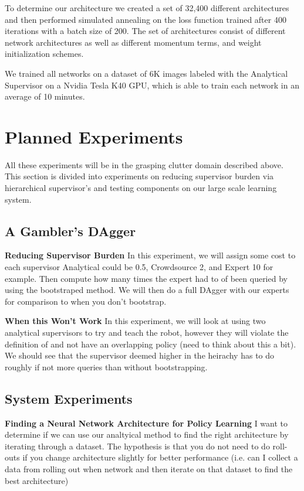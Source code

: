 \documentclass[10pt, conference]{ieeeconf}      %
\begin{document}
To determine our architecture we created a set of 32,400 different architectures and then performed simulated annealing on the loss function trained after 400 iterations with a batch size of 200. The set of architectures consist of different network architectures as well as different momentum terms, and weight initialization schemes. 

We trained all networks on a dataset of 6K images labeled with the Analytical Supervisor on a Nvidia Tesla K40 GPU, which is able to train each network in an average of 10 minutes.  


\section{Planned Experiments}
All these experiments will be in the grasping clutter domain described above. This section is divided into experiments on reducing supervisor burden via hierarchical supervisor's and testing components on our large scale learning system.  

\subsection{A Gambler's DAgger}

\noindent \textbf{Reducing Supervisor Burden}
In this experiment, we will assign some cost to each supervisor Analytical could be 0.5, Crowdsource 2, and Expert 10 for example. Then compute how many times the expert had to of been queried by using the bootstraped method. We will then do a full DAgger with our experts for comparison to when you don't bootstrap. 

\noindent \textbf{When this Won't Work}
In this experiment, we will look at using two analytical supervisors to try and teach the robot, however they will violate the definition of and not have an overlapping policy (need to think about this a bit). We should see that the supervisor deemed higher in the heirachy has to do roughly if not more queries than without bootstrapping. 

\subsection{System Experiments}

\noindent \textbf{Finding a Neural Network Architecture for Policy Learning}
I want to determine if we can use our analtyical method to find the right architecture by iterating through a dataset. The hypothesis is that you do not need to do roll-outs if you change architecture slightly for better performance (i.e. can I collect a data from rolling out when network and then iterate on that dataset to find the best architecture)
\end{document}
